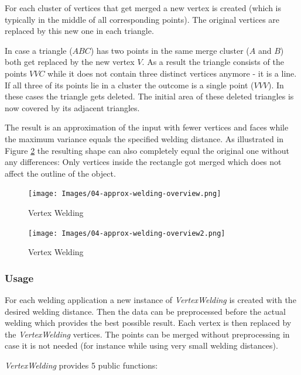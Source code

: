 \documentclass[../ClassicThesis.tex]{subfiles}
\begin{document}
For each cluster of vertices that get merged a new vertex is created (which is typically in the middle of all corresponding points). The original vertices are replaced by this new one in each triangle.

In case a triangle ($ABC$) has two points in the same merge cluster ($A$ and $B$) both get replaced by the new vertex $V$. As a result the triangle consists of the points $VVC$ while it does not contain three distinct vertices anymore - it is a line. If all three of its points lie in a cluster the outcome is a single point ($VVV$). In these cases the triangle gets deleted. The initial area of these deleted triangles is now covered by its adjacent triangles.

The result is an approximation of the input with fewer vertices and faces while the maximum variance equals the specified welding distance. As illustrated in Figure \ref{fig:vertex_welding} the resulting shape can also completely equal the original one without any differences: Only vertices inside the rectangle got merged which does not affect the outline of the object.


\begin{figure}
\texttt{[image: Images/04-approx-welding-overview.png]}
% 
\caption{Vertex Welding}
\label{fig:vertex_welding}
\end{figure}

\begin{figure}
\texttt{[image: Images/04-approx-welding-overview2.png]}
\caption{Vertex Welding}
\label{fig:vertex_welding}
\end{figure}

\subsubsection{Usage}

For each welding application a new instance of \emph{VertexWelding} is created with the desired welding distance. Then the data can be preprocessed before the actual welding which provides the best possible result. Each vertex is then replaced by the \emph{VertexWelding} vertices. The points can be merged without preprocessing in case it is not needed (for instance while using very small welding distances). 

\emph{VertexWelding} provides 5 public functions:

\end{document}
